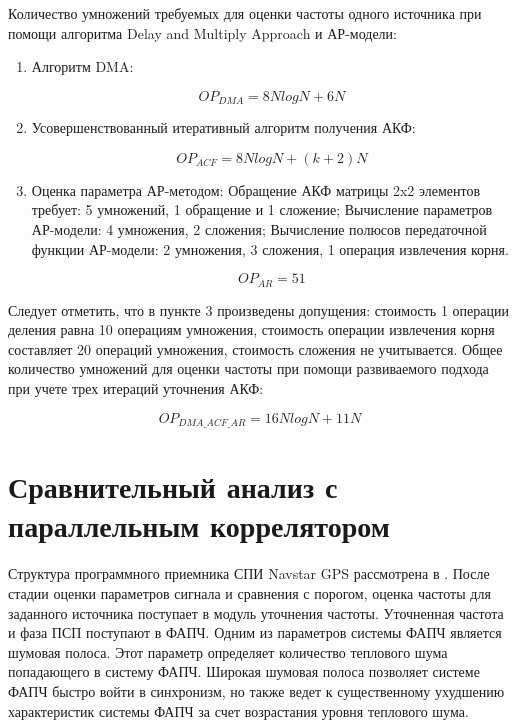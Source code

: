 Количество умножений требуемых для оценки частоты одного источника при помощи алгоритма Delay and Multiply Approach и АР-модели:
\begin{enumerate}
\item Алгоритм DMA:
	\begin{center}
	\begin{equation}
		OP_{DMA} = 8NlogN + 6N
	\end{equation}
	\end{center}
\item Усовершенствованный итеративный алгоритм получения АКФ:
	\begin{center}
	\begin{equation}
		OP_{ACF} = 8NlogN + (k+2)N
	\end{equation}
	\end{center}
\item Оценка параметра АР-методом:
	\subitem Обращение АКФ матрицы 2x2 элементов требует: 5 умножений, 1 обращение и 1 сложение;
	\subitem Вычисление параметров АР-модели: 4 умножения, 2 сложения;
	\subitem Вычисление полюсов передаточной функции АР-модели: 2 умножения, 3 сложения, 1 операция извлечения корня.

	\begin{center}
	\begin{equation}
		OP_{AR} = 51
	\end{equation}
	\end{center}
\end{enumerate}

Следует отметить, что в пункте 3 произведены допущения: стоимость 1 операции деления равна 10 операциям умножения, стоимость операции извлечения
корня составляет 20 операций умножения, стоимость сложения не учитывается.
Общее количество умножений для оценки частоты при помощи развиваемого подхода при учете трех итераций уточнения АКФ:
\begin{center}
\begin{equation}
	OP_{DMA\_ACF\_AR} = 16NlogN + 11N
\end{equation}
\end{center}

\section{Сравнительный анализ с параллельным коррелятором}
Структура программного приемника СПИ  Navstar GPS рассмотрена в \cite{tsui}. После стадии оценки параметров сигнала и сравнения с порогом, оценка
частоты для заданного источника поступает в модуль уточнения частоты. Уточненная частота и фаза ПСП поступают в ФАПЧ.
Одним из параметров системы ФАПЧ является шумовая полоса. Этот параметр определяет количество теплового шума попадающего в систему ФАПЧ.
Широкая шумовая полоса позволяет системе ФАПЧ быстро войти в синхронизм, но также ведет к существенному ухудшению характеристик системы ФАПЧ за счет возрастания уровня теплового шума. 

